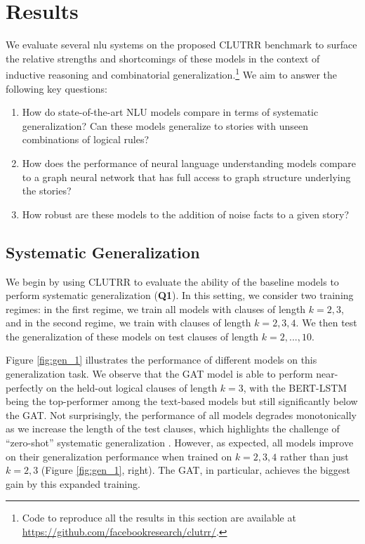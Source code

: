 \documentclass[letterpaper, 12pt]{report}
\begin{document}
\section{Results}
\label{sec:clutrr_results}

We evaluate several \acrshort{nlu} systems on the proposed CLUTRR benchmark to surface the relative strengths and shortcomings of these models in the context of inductive reasoning and combinatorial generalization.\footnote{Code to reproduce all the results in this section are available at  \href{https://github.com/facebookresearch/clutrr/}{https://github.com/facebookresearch/clutrr/}.} We aim to answer the following key questions:
\begin{enumerate}[label=({\bf Q\arabic*}), leftmargin=28pt, topsep=0pt, itemsep=0pt, parsep=0pt]
\item How do state-of-the-art NLU models compare in terms of systematic generalization? Can these models generalize to stories with unseen combinations of logical rules?
 \item How does the performance of neural language understanding models compare to a graph neural network that has full access to graph structure underlying the stories?
    \item How robust are these models to the addition of noise facts to a given story?
\end{enumerate}

\subsection{Systematic Generalization}
\label{sec:clutrr_sys_gen}

We begin by using CLUTRR to evaluate the ability of the baseline models to perform systematic generalization (\textbf{Q1}).
In this setting, we consider two training regimes: in the first regime, we train all models with clauses of length $k=2,3$, and in the second regime, we train with clauses of length $k=2,3,4$.
We then test the generalization of these models on test clauses of length $k=2,...,10$.

Figure \ref{fig:gen_1} illustrates the performance of different models on this generalization task.
We observe that the GAT model is able to perform near-perfectly on the held-out logical clauses of length $k=3$, with the BERT-LSTM being the top-performer among the text-based models but still significantly below the GAT.
Not surprisingly, the performance of all models degrades monotonically as we increase the length of the test clauses, which highlights the challenge of ``zero-shot'' systematic generalization \cite{lake2017generalization, 2018arXiv181107017S}.
However, as expected, all models improve on their generalization performance when trained on $k=2,3,4$ rather than just $k=2,3$ (Figure \ref{fig:gen_1}, right). The GAT, in particular, achieves the biggest gain by this expanded training.
\end{document}
